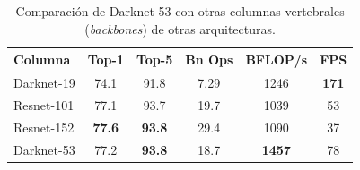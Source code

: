 \vspace*{0.5cm}

\begin{table}[h!]
\centering
\begin{tabular}{lccccc}
Columna    & Top-1         & Top-5         & Bn Ops & BFLOP/s       & FPS          \\
\hline
Darknet-19 & 74.1          & 91.8          & 7.29   & 1246          & \textbf{171} \\
Resnet-101 & 77.1          & 93.7          & 19.7   & 1039          & 53           \\
Resnet-152 & \textbf{77.6} & \textbf{93.8} & 29.4   & 1090          & 37           \\
Darknet-53 & 77.2          & \textbf{93.8} & 18.7   & \textbf{1457} & 78          
\end{tabular}
\caption[Comparaci\'on de Columnas Vertebrales]{Comparaci\'on de Darknet-53 con otras columnas vertebrales (\emph{backbones}) de otras arquitecturas.}
\label{table:backbones}
\end{table}

\vspace*{0.5cm}

